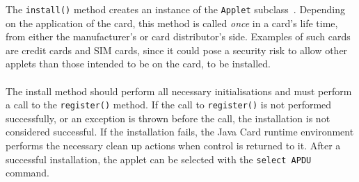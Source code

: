 The \texttt{install()} method creates an instance of the \texttt{Applet} subclass~\cite[p. 65]{java_card_spec}. Depending on the application of the card, this method is called \textit{once} in a card's life time, from either the manufacturer's or card distributor's side. Examples of such cards are credit cards and SIM cards, since it could pose a security risk to allow other applets than those intended to be on the card, to be installed.\\\\
The install method should perform all necessary initialisations and must perform a call to the \texttt{register()} method. If the call to \texttt{register()} is not performed successfully, or an exception is thrown before the call, the installation is not considered successful. If the installation fails, the Java Card runtime environment performs the necessary clean up actions when control is returned to it. After a successful installation, the applet can be selected with the \texttt{select APDU} command.